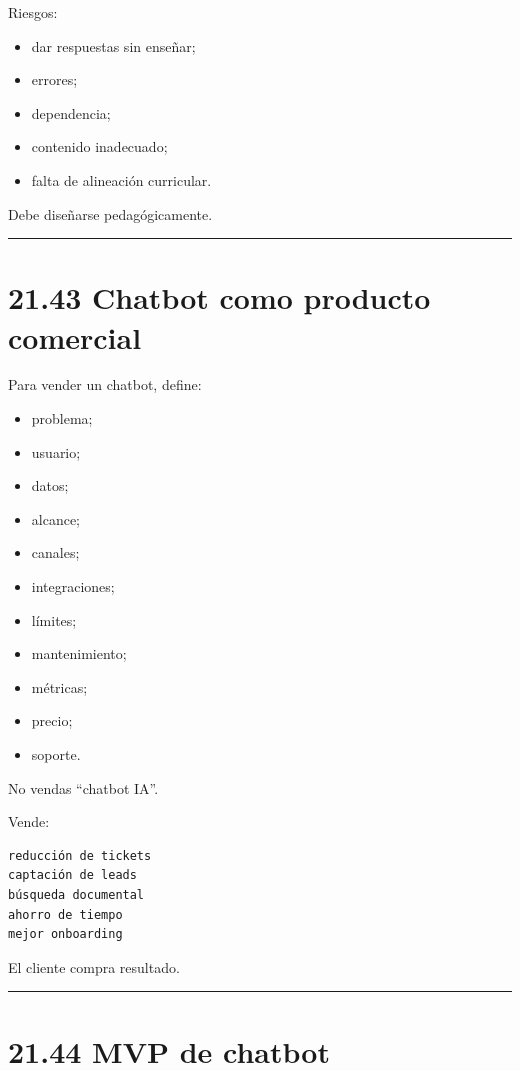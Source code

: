 Riesgos:

\begin{itemize}
\tightlist
\item
  dar respuestas sin enseñar;
\item
  errores;
\item
  dependencia;
\item
  contenido inadecuado;
\item
  falta de alineación curricular.
\end{itemize}

Debe diseñarse pedagógicamente.

\begin{center}\rule{0.5\linewidth}{0.5pt}\end{center}

\section{21.43 Chatbot como producto
comercial}\label{chatbot-como-producto-comercial}

Para vender un chatbot, define:

\begin{itemize}
\tightlist
\item
  problema;
\item
  usuario;
\item
  datos;
\item
  alcance;
\item
  canales;
\item
  integraciones;
\item
  límites;
\item
  mantenimiento;
\item
  métricas;
\item
  precio;
\item
  soporte.
\end{itemize}

No vendas ``chatbot IA''.

Vende:

\begin{lstlisting}
reducción de tickets
captación de leads
búsqueda documental
ahorro de tiempo
mejor onboarding
\end{lstlisting}

El cliente compra resultado.

\begin{center}\rule{0.5\linewidth}{0.5pt}\end{center}

\section{21.44 MVP de chatbot}\label{mvp-de-chatbot}

